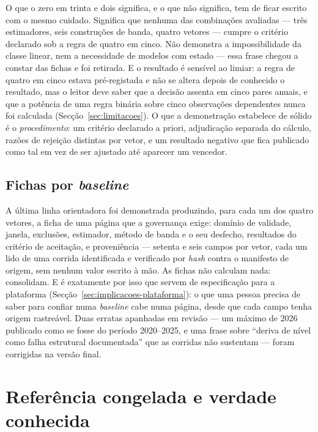 O que o zero em trinta e dois significa, e o que não significa, tem de ficar
escrito com o mesmo cuidado. Significa que nenhuma das combinações avaliadas
--- três estimadores, seis construções de banda, quatro vetores --- cumpre
o critério declarado sob a regra de quatro em cinco. Não demonstra a
impossibilidade da classe linear, nem a necessidade de modelos com estado
--- essa frase chegou a constar das fichas e foi retirada. E o resultado é
sensível ao limiar:  a regra de quatro em cinco estava pré-registada e não
se altera depois de conhecido o resultado, mas o leitor deve saber que a
decisão assenta em cinco pares anuais, e que a potência de uma regra binária
sobre cinco observações dependentes nunca foi calculada (Secção~\ref{sec:limitacoes}).
O que a demonstração estabelece de sólido é o \emph{procedimento}: um
critério declarado a priori, adjudicação separada do cálculo, razões de
rejeição distintas por vetor, e um resultado negativo que fica publicado
como tal em vez de ser ajustado até aparecer um vencedor.

\subsection{Fichas por \emph{baseline}}
\label{sec:demo-fichas}

A última linha orientadora foi demonstrada produzindo, para cada um dos
quatro vetores, a ficha de uma página que a governança exige: domínio de
validade, janela, exclusões, estimador, método de banda e o seu desfecho,
resultados do critério de aceitação, e proveniência --- setenta e seis
campos por vetor, cada um lido de uma corrida identificada e verificado por
\emph{hash} contra o manifesto de origem, sem nenhum valor escrito à mão. As
fichas não calculam nada: consolidam. E é exatamente por isso que servem de
especificação para a plataforma (Secção~\ref{sec:implicacoes-plataforma}): o
que uma pessoa precisa de saber para confiar numa \emph{baseline} cabe numa
página, desde que cada campo tenha origem rastreável. Duas erratas
apanhadas em revisão --- um máximo de 2026 publicado como se fosse do
período 2020--2025, e uma frase sobre ``deriva de nível como falha estrutural
documentada'' que as corridas não sustentam --- foram corrigidas na versão
final.

\section{Referência congelada e verdade conhecida}
\label{sec:referencia-congelada}

